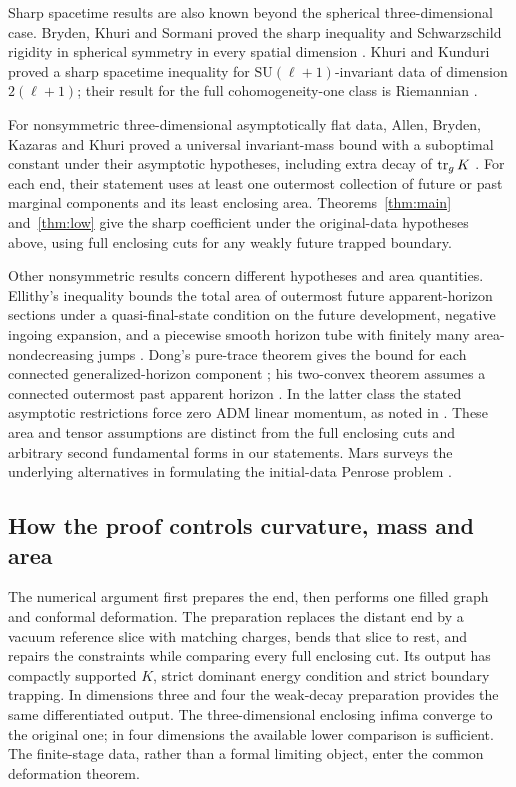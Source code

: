 Sharp spacetime results are also known beyond the spherical
three-dimensional case. Bryden, Khuri and Sormani proved the sharp
inequality and Schwarzschild rigidity in spherical symmetry in every
spatial dimension \cite{BrydenKhuriSormani2021}. Khuri and Kunduri proved a sharp spacetime
inequality for $\mathrm{SU}(\ell+1)$-invariant data of dimension $2(\ell+1)$;
their result for the full cohomogeneity-one class is Riemannian
\cite{KhuriKunduri2025}.

For nonsymmetric three-dimensional asymptotically flat data, Allen,
Bryden, Kazaras and Khuri proved a universal invariant-mass bound with
a suboptimal constant under their asymptotic hypotheses, including extra
decay of $\operatorname{tr}_gK$ \cite{AllenBrydenKazarasKhuri2025}. For each end, their statement uses
at least one outermost collection of future or past marginal components
and its least enclosing area. Theorems~\ref{thm:main} and~\ref{thm:low}
give the sharp coefficient under the original-data hypotheses above,
using full enclosing cuts for any weakly future trapped boundary.

Other nonsymmetric results concern different hypotheses and area
quantities. Ellithy's inequality bounds the total area of outermost future
apparent-horizon sections under a quasi-final-state condition on the
future development, negative ingoing expansion, and a piecewise smooth
horizon tube with finitely many area-nondecreasing jumps
\cite[Theorem~4.12]{Ellithy2026}. Dong's pure-trace theorem gives the
bound for each connected generalized-horizon component
\cite[Theorem~1.2]{Dong2026Sigma}; his two-convex theorem assumes a
connected outermost past apparent horizon
\cite[Theorem~1.2]{Dong2026TwoConvex}. In the latter class the stated
asymptotic restrictions force zero ADM linear momentum, as noted in
\cite[Remark~1.3]{Dong2026TwoConvex}. These area and tensor assumptions
are distinct from the full enclosing cuts and arbitrary second fundamental
forms in our statements. Mars surveys the underlying alternatives in
formulating the initial-data Penrose problem \cite{Mars2009}.

\subsection{How the proof controls curvature, mass and area}
The numerical argument first prepares the end, then performs one filled
graph and conformal deformation. The preparation replaces the distant
end by a vacuum reference slice with matching charges, bends that slice
to rest, and repairs the constraints while comparing every full enclosing
cut. Its output has compactly supported $K$, strict dominant energy
condition and strict boundary trapping. In dimensions three and four
the weak-decay preparation provides the same differentiated output.
The three-dimensional enclosing infima converge to the original one;
in four dimensions the available lower comparison is sufficient. The
finite-stage data, rather than a formal limiting object, enter the
common deformation theorem.

